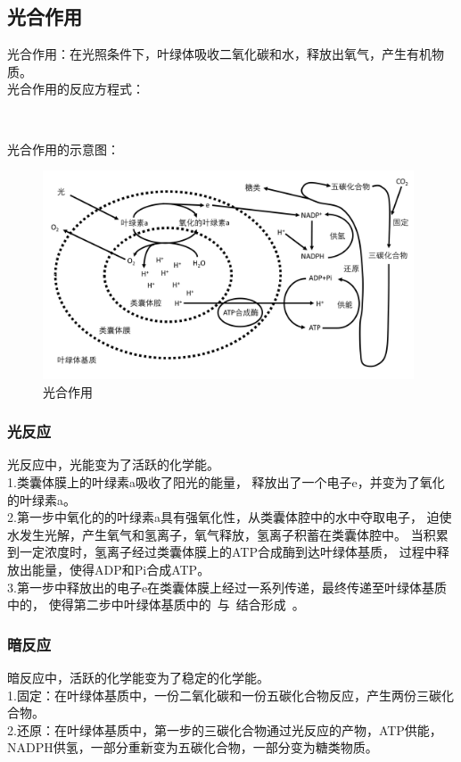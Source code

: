\documentclass[UTF8]{ctexart}
\begin{document}
\newpage
    
\subsection{光合作用}
    光合作用：在光照条件下，叶绿体吸收二氧化碳和水，释放出氧气，产生有机物质。\\[3mm]
    光合作用的反应方程式：
    \begin{center}
        \\[4mm]
    \end{center}
    光合作用的示意图：
    \begin{figure}[h!]
        \begin{center}
            \includegraphics[width=11cm]{BiologyImage/12.jpg}
            \caption{光合作用}
        \end{center}
    \end{figure}\vspace{-20pt}
    
\subsubsection{光反应}
    光反应中，光能变为了活跃的化学能。\\[3mm]
    1.类囊体膜上的叶绿素a吸收了阳光的能量，
    释放出了一个电子e，并变为了氧化的叶绿素a。\\[3mm]
    2.第一步中氧化的的叶绿素a具有强氧化性，从类囊体腔中的水中夺取电子，
    迫使水发生光解，产生氧气和氢离子，氧气释放，氢离子积蓄在类囊体腔中。
    当积累到一定浓度时，氢离子经过类囊体膜上的ATP合成酶到达叶绿体基质，
    过程中释放出能量，使得ADP和Pi合成ATP。\\[3mm]
    3.第一步中释放出的电子e在类囊体膜上经过一系列传递，最终传递至叶绿体基质中的，
    使得第二步中叶绿体基质中的~与~结合形成~。
    
\subsubsection{暗反应}
    暗反应中，活跃的化学能变为了稳定的化学能。\\[3mm]
    1.固定：在叶绿体基质中，一份二氧化碳和一份五碳化合物反应，产生两份三碳化合物。\\[3mm]
    2.还原：在叶绿体基质中，第一步的三碳化合物通过光反应的产物，ATP供能，NADPH供氢，一部分重新变为五碳化合物，一部分变为糖类物质。
    
\end{document}
